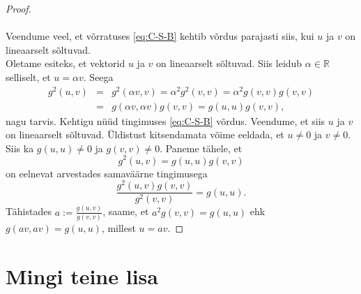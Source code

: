 \documentclass[a4paper,12pt]{article}
\numberwithin{equation}{section}
\begin{document}
\begin{appendices}
\begin{proof}
\paragraph{}
Veendume veel, et võrratuses \ref{eq:C-S-B} kehtib võrdus parajasti siis, kui $u$ ja $v$ on lineaarselt sõltuvad. \\
Oletame esiteks, et vektorid $u$ ja $v$ on lineaarselt sõltuvad. Siis leidub $\alpha \in \mathbb{R}$ selliselt, et $u = \alpha v$. Seega
\begin{eqnarray*}
g^2\left(u,v\right) &=& g^2 \left(\alpha v,v\right) = \alpha^2 g^2 \left(v,v\right) = \alpha^2 g \left(v,v\right) g \left(v,v\right) \\
&=& g \left(\alpha v,\alpha v\right)g \left( v,v\right) = g \left(u,u\right)g \left(v,v\right),
\end{eqnarray*}
nagu tarvis.
\newline
Kehtigu nüüd tingimuses \ref{eq:C-S-B} võrdus. Veendume, et siis $u$ ja $v$ on lineaarselt sõltuvad. Üldistust kitsendamata võime eeldada, et $u \neq 0$ ja $v \neq 0$. Siis ka $g \left(u,u\right) \neq 0$ ja $g \left(v,v\right) \neq 0$. Paneme tähele, et
\[g^2 \left(u, v \right) = g \left(u, u \right) g \left(v, v \right)\]
on eelnevat arvestades samaväärne tingimusega
\[\frac{g^2 \left(u, v \right) g \left(v, v \right)}{g^2 \left(v, v \right) } = g \left(u, u \right). \]
Tähistades $a := \frac{g \left(u, v \right) }{g \left(v, v \right) }$, saame, et $a^2 g \left(v, v \right) = g \left(u, u \right)$ ehk $g \left(av, av \right) = g \left(u, u \right)$, millest $u = av$.
\end{proof}

\section{Mingi teine lisa}

\end{appendices}

\vfill 
\end{document}

